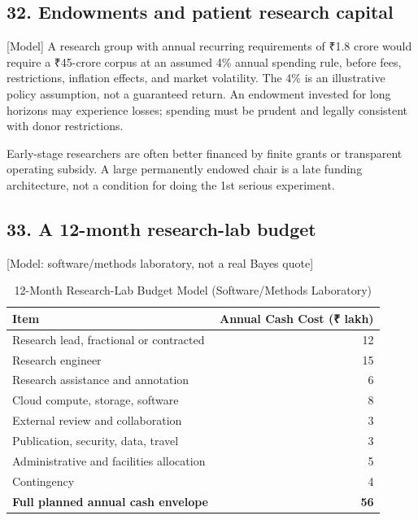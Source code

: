 \subsection{32. Endowments and patient research capital}

[Model] A research group with annual recurring requirements of ₹1.8 crore would require a ₹45-crore corpus at an assumed 4\% annual spending rule, before fees, restrictions, inflation effects, and market volatility. The 4\% is an illustrative policy assumption, not a guaranteed return. An endowment invested for long horizons may experience losses; spending must be prudent and legally consistent with donor restrictions.

Early-stage researchers are often better financed by finite grants or transparent operating subsidy. A large permanently endowed chair is a late funding architecture, not a condition for doing the 1st serious experiment.

\subsection{33. A 12-month research-lab budget}

[Model: software/methods laboratory, not a real Bayes quote]


\begin{table}[t]
\centering
\small
\caption{12-Month Research-Lab Budget Model (Software/Methods Laboratory)}
\label{tab:ch33_lab_budget}
\begin{tabularx}{\columnwidth}{X r}
\toprule
\textbf{Item} & \textbf{Annual Cash Cost (\textnormal{₹} lakh)} \\
\midrule
Research lead, fractional or contracted & 12 \\
Research engineer & 15 \\
Research assistance and annotation & 6 \\
Cloud compute, storage, software & 8 \\
External review and collaboration & 3 \\
Publication, security, data, travel & 3 \\
Administrative and facilities allocation & 5 \\
Contingency & 4 \\
\midrule
\textbf{Full planned annual cash envelope} & \textbf{56} \\
\bottomrule
\end{tabularx}
\end{table}


